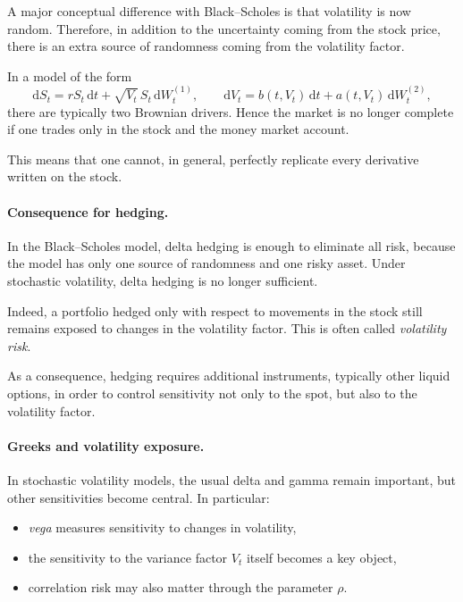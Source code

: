 \documentclass[11pt]{article}
\theoremstyle{plain}
\theoremstyle{definition}
\theoremstyle{remark}
\begin{document}
A major conceptual difference with Black--Scholes is that volatility is
now random.
Therefore, in addition to the uncertainty coming from the stock price,
there is an extra source of randomness coming from the volatility factor.

In a model of the form
\[
\mathrm{d}S_t
=
rS_t\,\mathrm{d}t
+
\sqrt{V_t}\,S_t\,\mathrm{d}W_t^{(1)},
\qquad
\mathrm{d}V_t
=
b(t,V_t)\,\mathrm{d}t
+
a(t,V_t)\,\mathrm{d}W_t^{(2)},
\]
there are typically two Brownian drivers.
Hence the market is no longer complete if one trades only in the stock
and the money market account.

This means that one cannot, in general, perfectly replicate every
derivative written on the stock.

\paragraph{Consequence for hedging.}

In the Black--Scholes model, delta hedging is enough to eliminate all
risk, because the model has only one source of randomness and one risky
asset.
Under stochastic volatility, delta hedging is no longer sufficient.

Indeed, a portfolio hedged only with respect to movements in the stock
still remains exposed to changes in the volatility factor.
This is often called \emph{volatility risk}.

As a consequence, hedging requires additional instruments, typically
other liquid options, in order to control sensitivity not only to the
spot, but also to the volatility factor.

\paragraph{Greeks and volatility exposure.}

In stochastic volatility models, the usual delta and gamma remain
important, but other sensitivities become central.
In particular:
\begin{itemize}[leftmargin=1.4em]
    \item \emph{vega} measures sensitivity to changes in volatility,
    \item the sensitivity to the variance factor \(V_t\) itself becomes
    a key object,
    \item correlation risk may also matter through the parameter \(\rho\).
\end{itemize}
\end{document}
